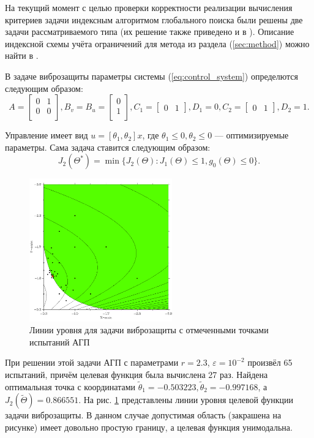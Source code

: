На текущий момент с целью проверки корректности реализации вычисления критериев задачи
индексным алгоритмом глобального поиска были решены две задачи рассматриваемого типа
(их решение также приведено и в \cite{optControl}).
Описание индексной схемы учёта ограничений для метода из раздела (\ref{sec:method}) можно
найти в \cite{strongSerg}.

В задаче виброзащиты параметры системы (\ref{eq:control_system}) определются следующим
образом:
$$
A=\begin{bmatrix}
    0       & 1 \\
    0       & 0 \\
\end{bmatrix},
B_v=B_u=\begin{bmatrix}
  0       \\
  1       \\
\end{bmatrix},
C_1=\begin{bmatrix}
  0     & 1
\end{bmatrix},D_1=0,
C_2=\begin{bmatrix}
  0     & 1
\end{bmatrix},D_2=1.
$$

Управление имеет вид \(u=[\theta_1,\theta_2]x\), где \(\theta_1 \leqslant 0,\theta_2\leqslant 0\) ---
оптимизируемые параметры. Сама задача ставится следующим образом:
\begin{displaymath}
   J_2(\Theta^*)=\min\{J_2(\Theta):J_1(\Theta)\leqslant 1, g_0(\Theta)\leqslant 0\}.
\end{displaymath}

\begin{figure}[ht]
  \center
  \includegraphics[width=0.55\textwidth]{images/controlProblem.png}
  \caption{Линии уровня для задачи виброзащиты с отмеченными точками испытаний АГП}
  \label{fig:controlProblem}
\end{figure}
При решении этой задачи АГП с параметрами \(r=2.3\), \(\varepsilon=10^{-2}\) произвёл
65 испытаний, причём целевая функция была вычислена 27 раз. Найдена оптимальная точка с координатами
\(\widetilde\theta_1 =-0.503223,\widetilde\theta_2=-0.997168\), а \(J_2(\widetilde\Theta)=0.866551\).
На рис. \ref{fig:controlProblem}
представлены линии уровня целевой функции задачи виброзащиты. В данном случае допустимая область (закрашена на рисунке)
имеет довольно простую границу, а целевая функция унимодальна.


